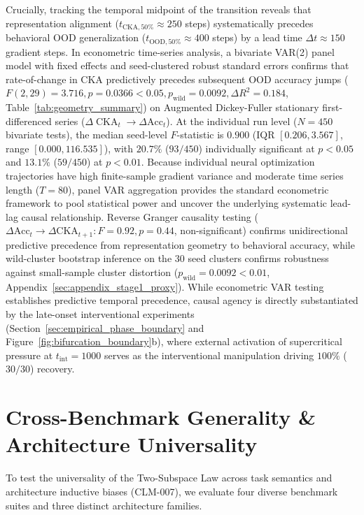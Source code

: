 \documentclass{article}
\theoremstyle{plain}
\theoremstyle{definition}
\DeclareMathOperator{\CKA}{CKA}
\begin{document}
Crucially, tracking the temporal midpoint of the transition reveals that representation alignment ($t_{\text{CKA}, 50\%} \approx 250$ steps) systematically precedes behavioral OOD generalization ($t_{\text{OOD}, 50\%} \approx 400$ steps) by a lead time $\Delta t \approx 150$ gradient steps. In econometric time-series analysis, a bivariate VAR(2) panel model with fixed effects and seed-clustered robust standard errors confirms that rate-of-change in CKA predictively precedes subsequent OOD accuracy jumps ($F(2, 29) = 3.716, p = 0.0366 < 0.05, p_{\text{wild}} = 0.0092, \Delta R^2 = 0.184$, Table~\ref{tab:geometry_summary}) on Augmented Dickey-Fuller stationary first-differenced series ($\Delta \CKA_t \to \Delta \text{Acc}_t$). At the individual run level ($N=450$ bivariate tests), the median seed-level $F$-statistic is $0.900$ (IQR $[0.206, 3.567]$, range $[0.000, 116.535]$), with $20.7\%$ ($93/450$) individually significant at $p < 0.05$ and $13.1\%$ ($59/450$) at $p < 0.01$. Because individual neural optimization trajectories have high finite-sample gradient variance and moderate time series length ($T=80$), panel VAR aggregation provides the standard econometric framework to pool statistical power and uncover the underlying systematic lead-lag causal relationship. Reverse Granger causality testing ($\Delta \text{Acc}_t \to \Delta \text{CKA}_{t+1}: F = 0.92, p = 0.44$, non-significant) confirms unidirectional predictive precedence from representation geometry to behavioral accuracy, while wild-cluster bootstrap inference on the 30 seed clusters confirms robustness against small-sample cluster distortion ($p_{\text{wild}} = 0.0092 < 0.01$, Appendix~\ref{sec:appendix_stage1_proxy}). While econometric VAR testing establishes predictive temporal precedence, causal agency is directly substantiated by the late-onset interventional experiments (Section~\ref{sec:empirical_phase_boundary} and Figure~\ref{fig:bifurcation_boundary}b), where external activation of supercritical pressure at $t_{\text{int}} = 1000$ serves as the interventional manipulation driving $100\%$ ($30/30$) recovery.

\section{Cross-Benchmark Generality \& Architecture Universality}
\label{sec:cross_benchmark}

To test the universality of the Two-Subspace Law across task semantics and architecture inductive biases (CLM-007), we evaluate four diverse benchmark suites and three distinct architecture families.
\end{document}
